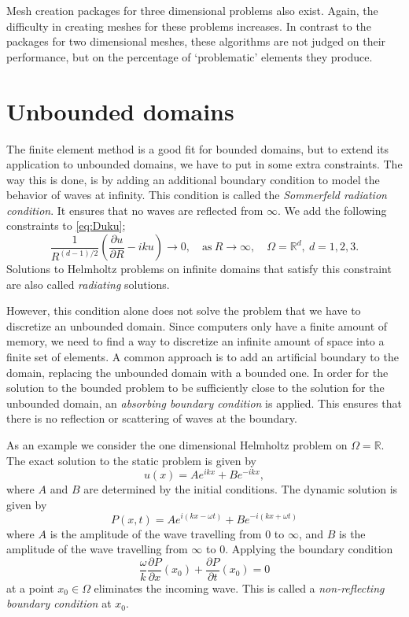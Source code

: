 \documentclass[a4paper]{article}
\newcommand{\Reals}{\mathbb{R}}
\begin{document}
Mesh creation packages for three dimensional problems also exist.
Again, the difficulty in creating meshes for these problems increases.
In contrast to the packages for two dimensional meshes, these
algorithms are not judged on their performance, but on the percentage
of `problematic' elements they produce.

\section{Unbounded domains}

The finite element method is a good fit for bounded domains, but to
extend its application to unbounded domains, we have to put in some
extra constraints. The way this is done, is by adding an
additional boundary condition to model the behavior of waves at
infinity. This condition is called the \emph{Sommerfeld radiation
condition}. It ensures that no waves are reflected from $\infty$. We
add the following constraints to \eqref{eq:Duku};
\begin{equation}
  \frac{1}{R^{(d - 1)/2}}
  \left( \frac{\partial u}{\partial R} - i k u \right)
  \rightarrow 0, \quad
  \text{as}\ R \rightarrow \infty, \quad \Omega = \Reals^d,\ d = 1, 2, 3.
\end{equation}
Solutions to Helmholtz problems on infinite domains that satisfy this
constraint are also called \emph{radiating} solutions.

However, this condition alone does not solve the problem that we have
to discretize an unbounded domain. Since computers only have a finite
amount of memory, we need to find a way to discretize an infinite
amount of space into a finite set of elements. A common approach is to
add an artificial boundary to the domain, replacing the unbounded
domain with a bounded one. In order for the solution to the bounded
problem to be sufficiently close to the solution for the unbounded
domain, an \emph{absorbing boundary condition} is applied. This
ensures that there is no reflection or scattering of waves at the
boundary.

As an example we consider the one dimensional Helmholtz problem on
$\Omega = \Reals$. The exact solution to the static problem is given
by
\begin{equation*}
  u(x) = A e^{i k x} + B e^{-i k x},
\end{equation*}
where $A$ and $B$ are determined by the initial conditions. The
dynamic solution is given by
\begin{equation*}
  P(x, t) = A e^{i(k x - \omega t)} + B e^{-i(k x + \omega t)}
\end{equation*}
where $A$ is the amplitude of the wave travelling from $0$ to
$\infty$, and $B$ is the amplitude of the wave travelling from
$\infty$ to $0$. Applying the boundary condition
\begin{equation*}
  \frac{\omega}{k} \frac{\partial P}{\partial x}(x_0)
  + \frac{\partial P}{\partial t}(x_0) = 0
\end{equation*}
at a point $x_0 \in \Omega$ eliminates the incoming wave. This is
called a \emph{non-reflecting boundary condition} at $x_0$.
\end{document}
